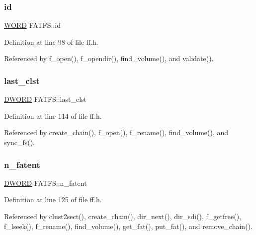 \subsubsection{\texorpdfstring{id}{id}}
{\footnotesize\ttfamily \hyperlink{integer_8h_a197942eefa7db30960ae396d68339b97}{W\+O\+RD} F\+A\+T\+F\+S\+::id}



Definition at line 98 of file ff.\+h.



Referenced by f\+\_\+open(), f\+\_\+opendir(), find\+\_\+volume(), and validate().

\mbox{\label{structFATFS_ac26e848817569fedc15a9a4e49ddedd1}} 
\subsubsection{\texorpdfstring{last\+\_\+clst}{last\_clst}}
{\footnotesize\ttfamily \hyperlink{integer_8h_ad342ac907eb044443153a22f964bf0af}{D\+W\+O\+RD} F\+A\+T\+F\+S\+::last\+\_\+clst}



Definition at line 114 of file ff.\+h.



Referenced by create\+\_\+chain(), f\+\_\+open(), f\+\_\+rename(), find\+\_\+volume(), and sync\+\_\+fs().

\mbox{\label{structFATFS_a8da50eeba6469bc20d60ca0cf9a1307c}} 
\subsubsection{\texorpdfstring{n\+\_\+fatent}{n\_fatent}}
{\footnotesize\ttfamily \hyperlink{integer_8h_ad342ac907eb044443153a22f964bf0af}{D\+W\+O\+RD} F\+A\+T\+F\+S\+::n\+\_\+fatent}



Definition at line 125 of file ff.\+h.



Referenced by clust2sect(), create\+\_\+chain(), dir\+\_\+next(), dir\+\_\+sdi(), f\+\_\+getfree(), f\+\_\+lseek(), f\+\_\+rename(), find\+\_\+volume(), get\+\_\+fat(), put\+\_\+fat(), and remove\+\_\+chain().

